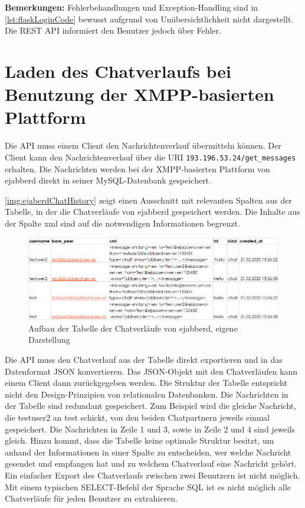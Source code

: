 \documentclass[a4paper,titlepage,halfparskip,12pt]{scrreprt}
\begin{document}
\begin{onehalfspacing}
\textbf{Bemerkungen:} Fehlerbehandlungen und Exception-Handling sind in \autoref{lst:flaskLoginCode} bewusst aufgrund von Unübersichtlichkeit nicht dargestellt. Die \acs{REST} \acs{API} informiert den Benutzer jedoch über Fehler.

\pagebreak

\section{Laden des Chatverlaufs bei Benutzung der \acs{XMPP}-basierten Plattform}

Die \acs{API} muss einem Client den Nachrichtenverlauf übermitteln können. Der Client kann den Nachrichtenverlauf über die \acs{URI} \texttt{193.196.53.24/get\_messages} erhalten.  Die Nachrichten werden bei der \acs{XMPP}-basierten Plattform von ejabberd direkt in seiner MySQL-Datenbank gespeichert.

\autoref{img:ejaberdChatHistory} zeigt einen Ausschnitt mit relevanten Spalten aus der Tabelle, in der die Chatverläufe von ejabberd gespeichert werden. Die Inhalte aus der Spalte xml sind auf die notwendigen Informationen begrenzt.

\begin{figure}[h]
	\centering
	\includegraphics[width=\textwidth]{images/ejabberdChatHistory}
	\caption{Aufbau der Tabelle der Chatverläufe von ejabberd, eigene Darstellung}
	\label{img:ejaberdChatHistory}
\end{figure}

Die \acs{API} muss den Chatverlauf aus der Tabelle direkt exportieren und in das Datenformat \acs{JSON} konvertieren. Das \acs{JSON}-Objekt mit den Chatverläufen kann einem Client dann zurückgegeben werden. Die Struktur der Tabelle entspricht nicht den Design-Prinzipien von relationalen Datenbanken. Die Nachrichten in der Tabelle sind redundant gespeichert. Zum Beispiel wird die gleiche Nachricht, die testuser2 an test schickt, von den beiden Chatpartnern jeweils einmal gespeichert. Die Nachrichten in Zeile 1 und 3, sowie in Zeile 2 und 4 sind jeweils gleich. Hinzu kommt, dass die Tabelle keine optimale Struktur besitzt, um anhand der Informationen in einer Spalte zu entscheiden, wer welche Nachricht gesendet und empfangen hat und zu welchem Chatverlauf eine Nachricht gehört. Ein einfacher Export des Chatverlaufs zwischen zwei Benutzern ist nicht möglich. Mit einem typischen SELECT-Befehl der Sprache \acs{SQL} ist es nicht möglich alle Chatverläufe für jeden Benutzer zu extrahieren.


\end{onehalfspacing}
\end{document}

